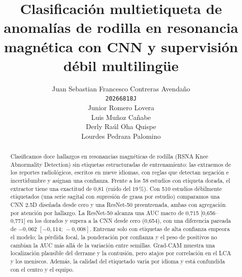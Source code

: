 \documentclass{article}
\title{Clasificación multietiqueta de anomalías de rodilla en resonancia magnética
  con CNN y supervisión débil multilingüe}
\author{%
  Juan Sebastian Francesco Contreras Avendaño\\
  \texttt{20266818J} \\
  \And
  Junior Romero Lovera \\
  \And
  Luis Muñoz Cañabe \\
  \And
  Derly Raúl Oha Quispe \\
  \And
  Lourdes Pedraza Palomino \\
}
\begin{document}
\maketitle

\begin{abstract}
  Clasificamos doce hallazgos en resonancias magnéticas de rodilla (RSNA Knee Abnormality
  Detection) sin etiquetas estructuradas de entrenamiento: las extraemos de los reportes
  radiológicos, escritos en nueve idiomas, con reglas que detectan negación e incertidumbre y
  asignan una confianza. Frente a los 58 estudios con etiqueta dorada, el extractor tiene una
  exactitud de 0,81 (ruido del 19\,\%). Con 510 estudios débilmente etiquetados (una serie
  sagital con supresión de grasa por estudio) comparamos una CNN 2.5D diseñada desde cero y
  una ResNet-50 preentrenada, ambas con agregación por atención por hallazgo. La ResNet-50
  alcanza una AUC macro de 0,715 [0,656--0,771] en los dorados y supera a la CNN desde cero
  (0,654), con una diferencia pareada de $-0{,}062$ $[-0{,}114;\,-0{,}008]$. Entrenar solo con
  etiquetas de alta confianza empeora el modelo; la pérdida focal, la ponderación por
  confianza y el peso de positivos no cambian la AUC más allá de la variación entre semillas.
  Grad-CAM muestra una localización plausible del derrame y la contusión, pero atajos por
  correlación en el LCA y los meniscos. Además, la calidad del etiquetado varía por idioma y
  está confundida con el centro y el equipo.
\end{abstract}












\end{document}
